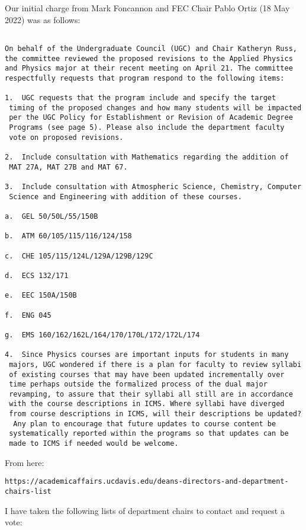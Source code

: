 \documentclass[12pt]{article}
\begin{document}
Our initial charge from Mark Foncannon and FEC Chair Pablo Ortiz (18 May 2022) was as follows:
\begin{verbatim}

On behalf of the Undergraduate Council (UGC) and Chair Katheryn Russ,
the committee reviewed the proposed revisions to the Applied Physics
and Physics major at their recent meeting on April 21. The committee
respectfully requests that program respond to the following items:

1.  UGC requests that the program include and specify the target
 timing of the proposed changes and how many students will be impacted
 per the UGC Policy for Establishment or Revision of Academic Degree
 Programs (see page 5). Please also include the department faculty
 vote on proposed revisions.

2.  Include consultation with Mathematics regarding the addition of
 MAT 27A, MAT 27B and MAT 67.

3.  Include consultation with Atmospheric Science, Chemistry, Computer
 Science and Engineering with addition of these courses.

a.  GEL 50/50L/55/150B

b.  ATM 60/105/115/116/124/158

c.  CHE 105/115/124L/129A/129B/129C

d.  ECS 132/171

e.  EEC 150A/150B

f.  ENG 045

g.  EMS 160/162/162L/164/170/170L/172/172L/174

4.  Since Physics courses are important inputs for students in many
 majors, UGC wondered if there is a plan for faculty to review syllabi
 of existing courses that may have been updated incrementally over
 time perhaps outside the formalized process of the dual major
 revamping, to assure that their syllabi all still are in accordance
 with the course descriptions in ICMS. Where syllabi have diverged
 from course descriptions in ICMS, will their descriptions be updated?
  Any plan to encourage that future updates to course content be
 systematically reported within the programs so that updates can be
 made to ICMS if needed would be welcome.
\end{verbatim}

From here:
\begin{verbatim}
https://academicaffairs.ucdavis.edu/deans-directors-and-department-chairs-list
\end{verbatim}
I have taken the following lists of department chairs to contact and request a vote:
\end{document}
